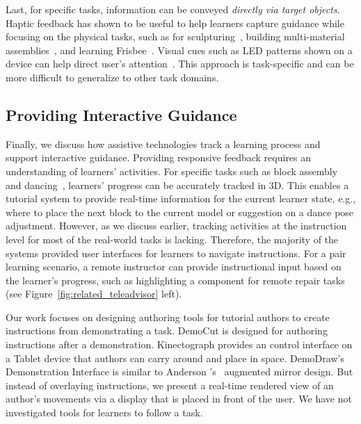 Last, for specific tasks, information can be conveyed \emph{directly via target objects}. Haptic feedback has shown to be useful to help learners capture guidance while focusing on the physical tasks, such as for sculpturing~\cite{Zoran:2013:FFD:2470654.2481361,Agrawal:2015:PPS:2807442.2807505}, building multi-material assemblies~\cite{Schoop:2016:DSS:2851581.2892429}, and learning Frisbee~\cite{Solomon:2014:UTI:2540930.2540965}. Visual cues such as LED patterns shown on a device can help direct user's attention~\cite{Solomon:2014:UTI:2540930.2540965,Vasey:2016:HHR:2897839.2927404}.
%
This approach is task-specific and can be more difficult to generalize to other task domains.

\subsection{Providing Interactive Guidance}
Finally, we discuss how assistive technologies track a learning process and support interactive guidance. Providing responsive feedback requires an understanding of learners' activities. For specific tasks such as block assembly~\cite{Gupta:2012ku,Wu:2016:ARI:2856400.2856416} and dancing~\cite{Anderson:2013:YEM:2501988.2502045}, learners' progress can be accurately tracked in 3D. This enables a tutorial system to provide real-time information for the current learner state, e.g., where to place the next block to the current model or suggestion on a dance pose adjustment.
%
However, as we discuss earlier, tracking activities at the instruction level for most of the real-world tasks is lacking. Therefore, the majority of the systems provided user interfaces for learners to navigate instructions.
%
For a pair learning scenario, a remote instructor can provide instructional input based on the learner's progress, such as highlighting a component for remote repair tasks~\cite{Gurevich:2012ko,Kirk:2006:CRG:1124772.1124951} (see Figure~\ref{fig:related_teleadvisor} left).

Our work focuses on designing authoring tools for tutorial authors to create instructions from demonstrating a task. DemoCut is designed for authoring instructions after a demonstration. Kinectograph provides an control interface on a Tablet device that authors can carry around and place in space. DemoDraw's Demonstration Interface is similar to Anderson \ea{}'s~\cite{Anderson:2013:YEM:2501988.2502045} augmented mirror design. But instead of overlaying instructions, we present a real-time rendered view of an author's movements via a display that is placed in front of the user. We have not investigated tools for learners to follow a task.

